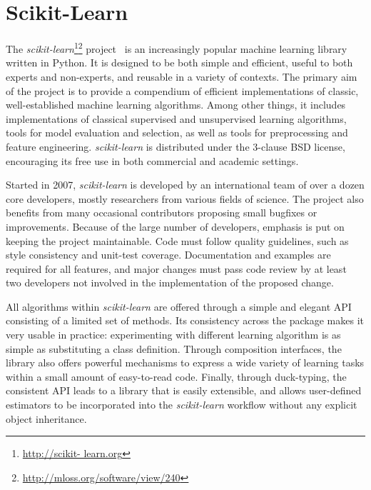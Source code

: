 \documentclass{article}
\newcommand{\sklearn}{\textit{scikit-learn}\xspace}
\begin{document}

\section*{Scikit-Learn}

The \sklearn\footnote{\url{http://scikit-
learn.org}}\footnote{\url{http://mloss.org/software/view/240}}
project~\citep{pedregosa2011} is an increasingly popular machine learning
library written in Python.  It is designed to be both  simple and efficient,
useful to both experts and non-experts, and reusable in a variety of contexts.
The  primary aim of the project is to provide a compendium of efficient
implementations of classic, well-established  machine learning algorithms.
Among other things, it includes implementations of classical supervised and
unsupervised learning algorithms, tools for model evaluation and selection, as
well as tools for preprocessing and feature engineering. \sklearn is
distributed under the 3-clause  BSD license, encouraging its free use in both
commercial and academic settings.

Started in 2007, \sklearn is developed by an international team of over a dozen
core developers, mostly researchers from various fields of science. The project
also benefits from many occasional contributors proposing small bugfixes or
improvements. Because of the large number of developers, emphasis is put on
keeping the project maintainable. Code must follow quality guidelines, such as
style consistency and unit-test coverage. Documentation and examples are
required for all features, and major changes must pass code review by at least
two developers not involved in the implementation of the proposed change.

All algorithms within \sklearn are offered through a simple and elegant
API~\citep{buitinck2013api} consisting of a limited set of methods. Its
consistency across the package makes it very usable in practice: experimenting
with different learning algorithm is as simple as substituting a class
definition. Through composition interfaces, the library also offers powerful
mechanisms to express a wide variety of learning tasks within a small amount of
easy-to-read code. Finally, through duck-typing, the consistent API leads to a
library that is easily extensible, and allows user-defined estimators to be
incorporated into the \sklearn workflow without any explicit object
inheritance.
\end{document}
